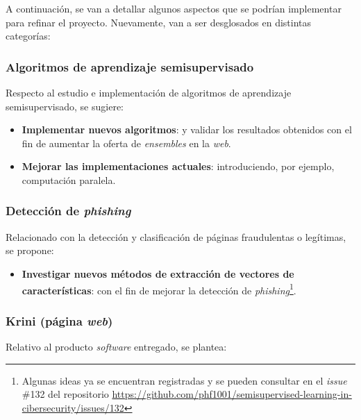 A continuación, se van a detallar algunos aspectos que se podrían implementar para refinar el proyecto. Nuevamente, van a ser desglosados en distintas categorías:

\subsubsection{Algoritmos de aprendizaje semisupervisado}

Respecto al estudio e implementación de algoritmos de aprendizaje semisupervisado, se sugiere:

\begin{itemize}
	\item \textbf{Implementar nuevos algoritmos}: y validar los resultados obtenidos con el fin de aumentar la oferta de \textit{ensembles} en la \textit{web}.
	\item \textbf{Mejorar las implementaciones actuales}: introduciendo, por ejemplo, computación paralela.
\end{itemize}

\subsubsection{Detección de \textit{phishing}}

Relacionado con la detección y clasificación de páginas fraudulentas o legítimas, se propone:

\begin{itemize}
	\item \textbf{Investigar nuevos métodos de extracción de vectores de características}: con el fin de mejorar la detección de \textit{phishing}\footnote{Algunas ideas ya se encuentran registradas y se pueden consultar en el \textit{issue} \#132 del repositorio \url{https://github.com/phf1001/semisupervised-learning-in-cibersecurity/issues/132}}.
\end{itemize}


\subsubsection{Krini (página \textit{web})}

Relativo al producto \textit{software} entregado, se plantea:

